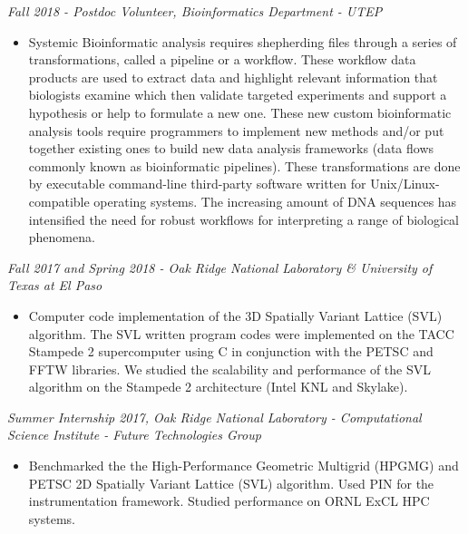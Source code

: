\documentclass[margin]{res}
\begin{document}
\begin{resume}
{\sl Fall 2018 - Postdoc Volunteer, Bioinformatics Department - UTEP} %
\begin{itemize}\itemsep -2pt
\item Systemic Bioinformatic analysis requires shepherding files through a series of transformations, called a pipeline or a workflow.
These workflow data products are used to extract data and highlight relevant information that biologists examine which then validate targeted 
experiments and support a hypothesis or help to formulate a new one. These new custom bioinformatic analysis tools require programmers to implement
new methods and/or put together existing ones to build new data analysis frameworks (data flows commonly known as bioinformatic pipelines).
These transformations are done by executable command-line third-party software written for Unix/Linux-compatible operating systems. The increasing amount of DNA
sequences has intensified the need for robust workflows for interpreting a range of biological phenomena.
\end{itemize}

{\sl Fall 2017 and Spring 2018 - Oak Ridge National Laboratory \& University of Texas at El Paso} \hfill  
\begin{itemize}
\item Computer code implementation of the 3D Spatially Variant Lattice (SVL) algorithm.
The SVL written program codes were implemented on the TACC Stampede 2 supercomputer using C in conjunction with the PETSC and FFTW libraries.
We studied the scalability and performance of the SVL algorithm on the Stampede 2 architecture (Intel KNL and Skylake).
\end{itemize}

{\sl Summer Internship 2017, Oak Ridge National Laboratory - Computational Science Institute - Future Technologies Group  }%
\begin{itemize}
\item Benchmarked the the High-Performance Geometric Multigrid (HPGMG) and PETSC 2D Spatially Variant Lattice (SVL) algorithm.
Used PIN for the instrumentation framework. Studied performance on ORNL ExCL HPC systems.
\end{itemize}


\end{resume}
\end{document}
